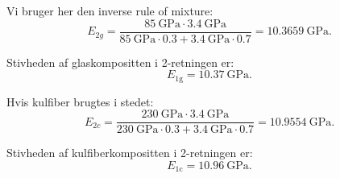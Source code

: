\begin{derivation}

  \derivationpart

  Vi bruger her den inverse rule of mixture:
  \begin{equation*}
    E_{\mathrm{2}g} = \frac{\qty{85}{\GPa} \cdot \qty{3,4}{\GPa} }{\qty{85}{\GPa} \cdot \num{0,3} + \qty{3,4}{\GPa} \cdot \num{0,7} } = \qty{10.3659}{\GPa}
  .\end{equation*}

  \begin{subresult}
    Stivheden af glaskompositten i 2-retningen er:
    \begin{equation*}
      E_{1\mathrm{g}} = \qty{10,37}{\GPa} 
    .\end{equation*}
  \end{subresult}

  \derivationpart
  
  Hvis kulfiber brugtes i stedet:
  \begin{equation*}
  E_{\mathrm{2}c} = \frac{\qty{230}{\GPa} \cdot \qty{3,4}{\GPa} }{\qty{230}{\GPa} \cdot \num{0,3} + \qty{3,4}{\GPa} \cdot \num{0,7} }  = \qty{10.9554}{\GPa}
  .\end{equation*}

  \begin{subresult}
    Stivheden af kulfiberkompositten i 2-retningen er:
    \begin{equation*}
      E_{1\mathrm{c}} = \qty{10,96}{\GPa} 
    .\end{equation*}
  \end{subresult}
\end{derivation}
